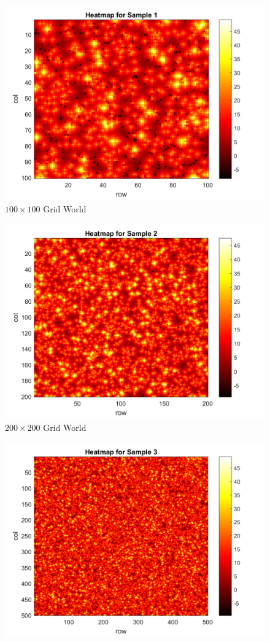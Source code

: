 \documentclass[letterpaper,twocolumn,10pt]{article}
\begin{document}
{\begin{figure}
	\centering
	\includegraphics[scale=0.27]{sample1_hm}
	\caption{$100\times100$ Grid World}
\end{figure}
\begin{figure}
	\centering
	\includegraphics[scale=0.27]{sample2_hm}
	\caption{$200\times200$ Grid World}
\end{figure}
\begin{figure}
	\centering
	\includegraphics[scale=0.27]{sample3_hm}

\end{figure}}
\end{document}

